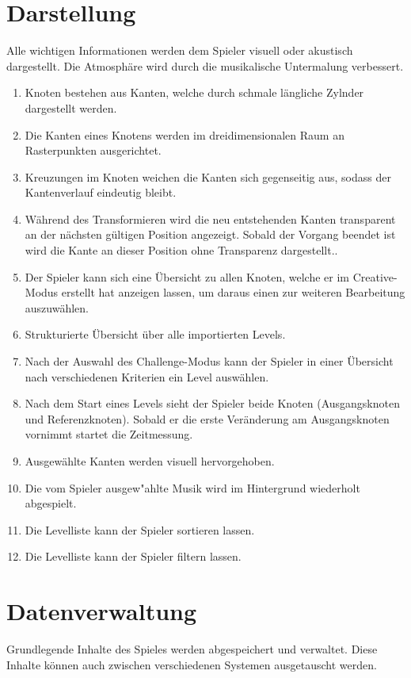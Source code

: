 \section{Darstellung}
Alle wichtigen Informationen werden dem Spieler visuell oder akustisch dargestellt. Die Atmosphäre wird durch die musikalische Untermalung verbessert.

\begin{enumerate}[resume]
\item Knoten bestehen aus Kanten, welche durch schmale längliche Zylnder dargestellt werden.
\item Die Kanten eines Knotens werden im dreidimensionalen Raum an Rasterpunkten ausgerichtet.
\item Kreuzungen im Knoten weichen die Kanten sich gegenseitig aus, sodass der Kantenverlauf eindeutig bleibt.
\item Während des Transformieren wird die neu entstehenden Kanten transparent an der nächsten gültigen Position angezeigt. Sobald der Vorgang beendet ist wird die Kante an dieser Position ohne Transparenz dargestellt..
\item Der Spieler kann sich eine Übersicht zu allen Knoten, welche er im Creative-Modus erstellt hat anzeigen lassen, um daraus einen zur weiteren Bearbeitung auszuwählen.
\item Strukturierte Übersicht über alle importierten Levels. %
\item Nach der Auswahl des Challenge-Modus kann der Spieler in einer Übersicht nach verschiedenen Kriterien ein Level auswählen.
\item Nach dem Start eines Levels sieht der Spieler beide Knoten (Ausgangsknoten und Referenzknoten). Sobald er die erste Veränderung am Ausgangsknoten vornimmt startet die Zeitmessung.
\item Ausgewählte Kanten werden visuell hervorgehoben.
\item Die vom Spieler ausgew{"a}hlte Musik wird im Hintergrund wiederholt abgespielt. %
\item Die Levelliste kann der Spieler sortieren lassen. %
\item Die Levelliste kann der Spieler filtern lassen. %

\end{enumerate}
\section{Datenverwaltung}
Grundlegende Inhalte des Spieles werden abgespeichert und verwaltet.
Diese Inhalte können auch zwischen verschiedenen Systemen ausgetauscht werden. 

